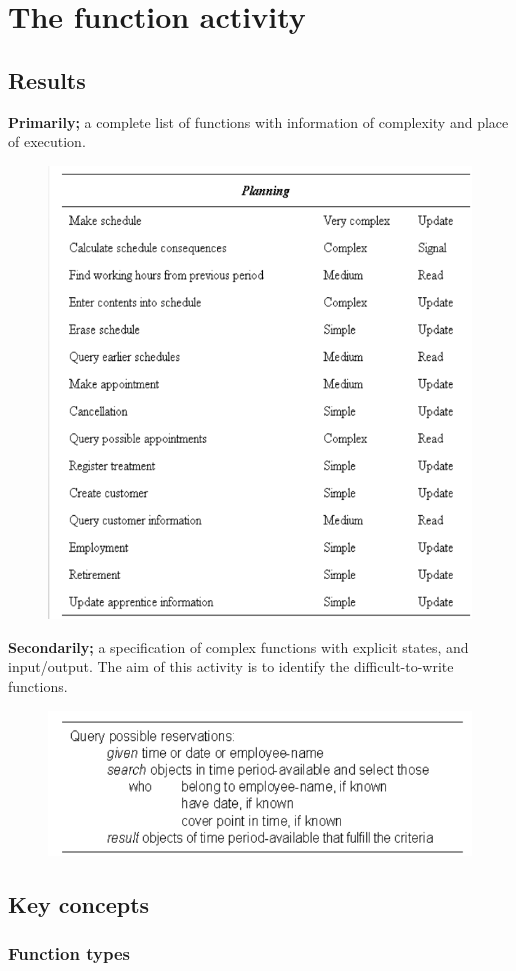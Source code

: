\section{The function activity}
\subsection{Results}
\textbf{Primarily;} a complete list of functions with information of complexity and place of execution. 

\begin{figure}[H]\label{fig:primaryfunctions}
    \centering
    \includegraphics[width=.5\textwidth]{figures/primaryfunctions.png}
\end{figure}

\textbf{Secondarily;} a specification of complex functions with explicit states, and input/output. The aim of this activity is to identify the difficult-to-write functions.

\begin{figure}[H]
    \centering
    \includegraphics[width=.5\textwidth]{figures/secondaryfunctions.png}
\end{figure}

\subsection{Key concepts}

\subsubsection{Function types}

